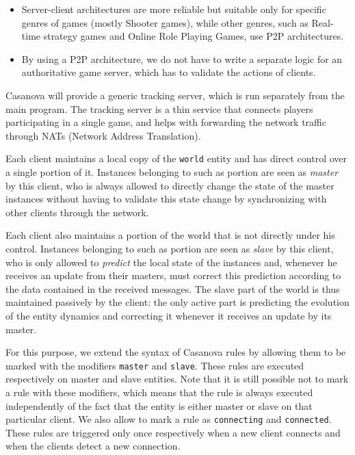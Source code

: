 \begin{itemize}
	\item Server-client architectures are more reliable but suitable only for specific genres of games (mostly Shooter games), while other genres, such as Real-time strategy games and Online Role Playing Games, use P2P architectures.
	\item By using a P2P architecture, we do not have to write a separate logic for an authoritative game server, which has to validate the actions of clients.
\end{itemize}

Casanova will provide a generic tracking server, which is run separately from the main program. The tracking server is a thin service that connects players participating in a single game, and helps with forwarding the network traffic through NATs (Network Address Translation).

Each client maintains a local copy of the \texttt{world} entity and has direct control over a single portion of it. Instances belonging to such as portion are seen as \textit{master} by this client, who is always allowed to directly change the state of the master instances without having to validate this state change by synchronizing with other clients through the network.

Each client also maintains a portion of the world that is not directly under his control. Instances belonging to such as portion are seen as \textit{slave} by this client, who is only allowed to \textit{predict} the local state of the instances and, whenever he receives an update from their masters, must correct this prediction according to the data contained in the received messages. The slave part of the world is thus maintained passively by the client: the only active part is predicting the evolution of the entity dynamics and correcting it whenever it receives an update by its master.

For this purpose, we extend the syntax of Casanova rules by allowing them to be marked with the modifiers \texttt{master} and \texttt{slave}. These rules are executed respectively on master and slave entities. Note that it is still possible not to mark a rule with these modifiers, which means that the rule is always executed independently of the fact that the entity is either master or slave on that particular client. We also allow to mark a rule as \texttt{connecting} and \texttt{connected}. These rules are triggered only once respectively when a new client connects and when the clients detect a new connection.

